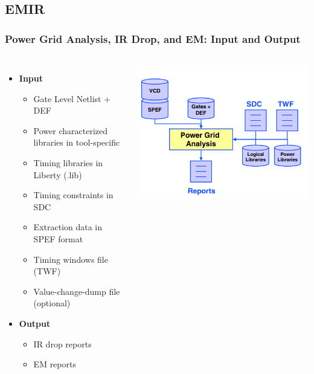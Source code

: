 \documentclass[compress]{beamer}
\begin{document}
\subsection[EMIR]{EMIR}
\begin{frame}
	\frametitle{Power Grid Analysis, IR Drop, and EM: Input and Output}
	\begin{columns}	
		\begin{itemize}
			\item \textbf{Input}
			\begin{itemize}
				\item Gate Level Netlist + DEF
				\item Power characterized libraries in
				tool-specific 
				\item Timing libraries in Liberty (.lib)
				\item Timing constraints in SDC
				\item Extraction data in SPEF format
				\item Timing windows file (TWF)
				\item Value-change-dump file (optional)
			\end{itemize}
			\item \textbf{Output}
			\begin{itemize}
				\item IR drop reports
				\item EM reports
			\end{itemize}
			\end{itemize}
				\begin{center}
					\includegraphics[width=\textwidth]{EMIR}
				\end{center}
			\end{columns}
\end{frame}
\end{document}
